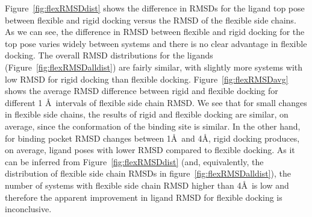 \documentclass[journal=jcisd8,manuscript=article]{achemso}
\begin{document}
Figure~\ref{fig:flexRMSDdist} shows the difference in RMSDs for the ligand top pose between flexible and rigid docking versus the RMSD of the flexible side chains. As we can see, the difference in RMSD between flexible and rigid docking for the top pose varies widely between systems and there is no clear advantage in flexible docking. The overall RMSD distributions for the ligands (Figure~\ref{fig:flexRMSDalldist}) are fairly similar, with slightly more systems with low RMSD for rigid docking than flexible docking. Figure~\ref{fig:flexRMSDavg} shows the average RMSD difference between rigid and flexible docking for different 1 \AA\ intervals of flexible side chain RMSD. We see that for small changes in flexible side chains, the results of rigid and flexible docking are similar, on average, since the conformation of the binding site is similar. In the other hand, for binding pocket RMSD changes between 1\AA\ and 4\AA, rigid docking produces, on average, ligand poses with lower RMSD compared to flexible docking. As it can be inferred from Figure~\ref{fig:flexRMSDdist} (and, equivalently, the distribution of flexible side chain RMSDs in figure~\ref{fig:flexRMSDalldist}), the number of systems with flexible side chain RMSD higher than 4\AA\, is low and therefore the apparent improvement in ligand RMSD for flexible docking is inconclusive.
\end{document}
